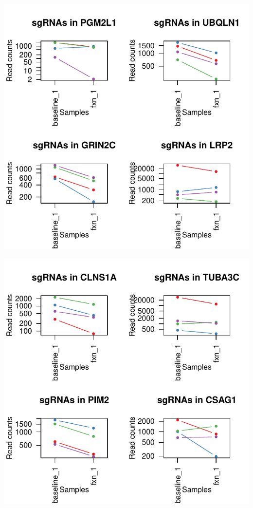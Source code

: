 \documentclass{article}
\begin{document}
\includegraphics{defaultTest_defaultNormCount_screen1_summary-005}
%


\includegraphics{defaultTest_defaultNormCount_screen1_summary-006}
%
\end{document}
